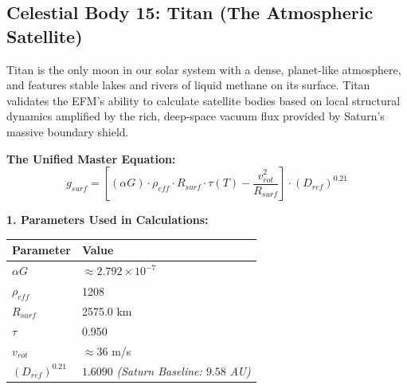 \documentclass[11pt, a4paper]{article}
\begin{document}
\clearpage
\subsection{Celestial Body 15: Titan (The Atmospheric Satellite)}
  Titan is the only moon in our solar system with a dense, planet-like atmosphere, and features stable lakes and rivers of liquid methane on its surface. Titan validates the EFM's ability to calculate satellite bodies based on local structural dynamics amplified by the rich, deep-space vacuum flux provided by Saturn's massive boundary shield.

  \vspace{0.5em}
  \noindent \textbf{The Unified Master Equation:}
  $$ g_{surf} = \left[ (\alpha G) \cdot \rho_{eff} \cdot R_{surf} \cdot \tau(T) - \frac{v_{rot}^2}{R_{surf}} \right] \cdot (D_{ref})^{0.21} $$

  \vspace{0.5em}
  \noindent \textbf{1. Parameters Used in Calculations:} \\[0.5em]
  \begingroup
  \renewcommand{\arraystretch}{1.3}
  \hspace*{2em}
  \begin{tabular}{|l|l|}
    \hline
    \textbf{Parameter} & \textbf{Value} \\ \hline
    $\alpha G$ & $\approx 2.792 \times 10^{-7}$ \\ \hline
    $\rho_{eff}$ & 1208 \\ \hline
    $R_{surf}$ & 2575.0 km \\ \hline
    $\tau$ & 0.950 \\ \hline
    $v_{rot}$ & $\approx 36$ m/s \\ \hline
    $(D_{ref})^{0.21}$ & $1.6090$ \textit{(Saturn Baseline: $9.58$ AU)} \\ \hline
  \end{tabular}
  \endgroup
\end{document}
